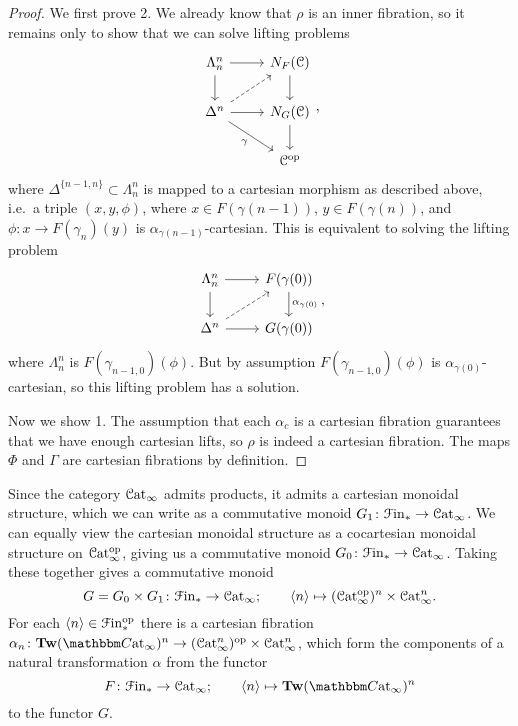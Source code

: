 \documentclass[main.tex]{subfiles}
\begin{document}
\begin{proof}
  We first prove 2. We already know \cite[Lemma~3.2.5.11]{highertopostheory} that $\rho$ is an inner fibration, so it remains only to show that we can solve lifting problems
  \begin{equation*}
    \begin{tikzcd}
      \Lambda^{n}_{n}
      \arrow[r]
      \arrow[d]
      & N_{F}(\category{C})
      \arrow[d]
      \\
      \Delta^{n}
      \arrow[r]
      \arrow[ur, dashed]
      \arrow[dr, swap, "\gamma"]
      & N_{G}(\category{C})
      \arrow[d]
      \\
      & \category{C}\op
    \end{tikzcd},
  \end{equation*}
  where $\Delta^{\{n-1, n\}} \subset \Lambda^{n}_{n}$ is mapped to a cartesian morphism as described above, i.e.\ a triple $(x, y, \phi)$, where $x \in F(\gamma(n-1))$, $y \in F(\gamma(n))$, and $\phi\colon x \to F(\gamma_{n})(y)$ is $\alpha_{\gamma(n-1)}$-cartesian. This is equivalent to solving the lifting problem
  \begin{equation*}
    \begin{tikzcd}
      \Lambda^{n}_{n}
      \arrow[r]
      \arrow[d]
      & F(\gamma(0))
      \arrow[d, "\alpha_{\gamma(0)}"]
      \\
      \Delta^{n}
      \arrow[r]
      \arrow[ur, dashed]
      & G(\gamma(0))
    \end{tikzcd},
  \end{equation*}
  where $\Lambda^{n}_{n}$ is $F(\gamma_{n-1, 0})(\phi)$. But by assumption $F(\gamma_{n-1, 0})(\phi)$ is $\alpha_{\gamma(0)}$-cartesian, so this lifting problem has a solution.

  Now we show 1. The assumption that each $\alpha_{c}$ is a cartesian fibration guarantees that we have enough cartesian lifts, so $\rho$ is indeed a cartesian fibration. The maps $\Phi$ and $\Gamma$ are cartesian fibrations by definition.
\end{proof}


Since the category $\mathcal{C}\mathrm{at}_{\infty}$ admits products, it admits a cartesian monoidal structure, which we can write as a commutative monoid $G_{1}\colon \mathcal{F}\mathrm{in}_{*} \to \mathcal{C}\mathrm{at}_{\infty}$. We can equally view the cartesian monoidal structure as a cocartesian monoidal structure on $\mathcal{C}\mathrm{at}_{\infty}^{\mathrm{op}}$, giving us a commutative monoid $G_{0}\colon \mathcal{F}\mathrm{in}_{*} \to \mathcal{C}\mathrm{at}_{\infty}$. Taking these together gives a commutative monoid
\begin{equation*}
  G = G_{0} \times G_{1}\colon \mathcal{F}\mathrm{in}_{*} \to \mathcal{C}\mathrm{at}_{\infty};\qquad \langle n \rangle \mapsto ( \mathcal{C}\mathrm{at}_{\infty}^{\mathrm{op}} )^{n} \times \mathcal{C}\mathrm{at}_{\infty}^{n}.
\end{equation*}
For each $\langle n \rangle \in \mathcal{F}\mathrm{in}_{*}^{\mathrm{op}}$ there is a cartesian fibration $\alpha_{n}\colon \Tw(\ICCat)^{n} \to (\ICat^{n})\op \times \ICat^{n}$, which form the components of a natural transformation $\alpha$ from the functor
\begin{equation*}
  F\colon \Finp \to \ICat;\qquad \langle n \rangle \mapsto \Tw(\ICCat)^{n}
\end{equation*}
to the functor $G$.
\end{document}
